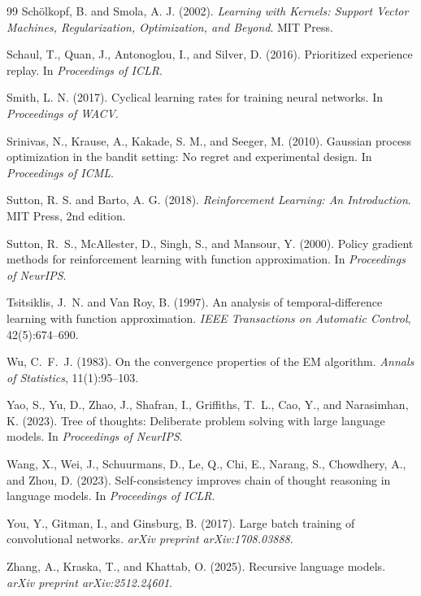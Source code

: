 \documentclass[12pt,a4paper]{article}
\begin{document}
\begin{thebibliography}{99}
Sch\"{o}lkopf, B. and Smola, A. J. (2002).
\newblock \emph{Learning with Kernels: Support Vector Machines, Regularization,
  Optimization, and Beyond}.
\newblock MIT Press.

Schaul, T., Quan, J., Antonoglou, I., and Silver, D. (2016).
\newblock Prioritized experience replay.
\newblock In \emph{Proceedings of ICLR}.

Smith, L. N. (2017).
\newblock Cyclical learning rates for training neural networks.
\newblock In \emph{Proceedings of WACV}.

Srinivas, N., Krause, A., Kakade, S. M., and Seeger, M. (2010).
\newblock Gaussian process optimization in the bandit setting: No regret and
  experimental design.
\newblock In \emph{Proceedings of ICML}.

Sutton, R. S. and Barto, A. G. (2018).
\newblock \emph{Reinforcement Learning: An Introduction}.
\newblock MIT Press, 2nd edition.

Sutton, R.~S., McAllester, D., Singh, S., and Mansour, Y. (2000).
\newblock Policy gradient methods for reinforcement learning with function
  approximation.
\newblock In \emph{Proceedings of NeurIPS}.

Tsitsiklis, J.~N. and Van Roy, B. (1997).
\newblock An analysis of temporal-difference learning with function
  approximation.
\newblock \emph{IEEE Transactions on Automatic Control}, 42(5):674--690.

Wu, C.~F.~J. (1983).
\newblock On the convergence properties of the EM algorithm.
\newblock \emph{Annals of Statistics}, 11(1):95--103.

Yao, S., Yu, D., Zhao, J., Shafran, I., Griffiths, T.~L., Cao, Y., and
  Narasimhan, K. (2023).
\newblock Tree of thoughts: Deliberate problem solving with large language
  models.
\newblock In \emph{Proceedings of NeurIPS}.

Wang, X., Wei, J., Schuurmans, D., Le, Q., Chi, E., Narang, S., Chowdhery, A.,
  and Zhou, D. (2023).
\newblock Self-consistency improves chain of thought reasoning in language
  models.
\newblock In \emph{Proceedings of ICLR}.

You, Y., Gitman, I., and Ginsburg, B. (2017).
\newblock Large batch training of convolutional networks.
\newblock \emph{arXiv preprint arXiv:1708.03888}.

Zhang, A., Kraska, T., and Khattab, O. (2025).
\newblock Recursive language models.
\newblock \emph{arXiv preprint arXiv:2512.24601}.

\enlargethispage{2\baselineskip}
\end{thebibliography}
\end{document}
